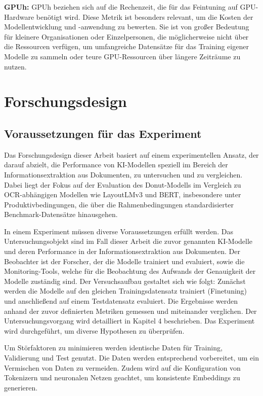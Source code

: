 \textbf{GPUh:} \ac{GPUh} beziehen sich auf die Rechenzeit, die für das Feintuning auf GPU-Hardware benötigt wird. Diese Metrik ist besonders relevant, um die Kosten der Modellentwicklung und -anwendung zu bewerten. Sie ist von großer Bedeutung für kleinere Organisationen oder Einzelpersonen, die möglicherweise nicht über die Ressourcen verfügen, um umfangreiche Datensätze für das Training eigener Modelle zu sammeln oder teure GPU-Ressourcen über längere Zeiträume zu nutzen.

\section{Forschungsdesign}
\subsection{Voraussetzungen für das Experiment}
Das Forschungsdesign dieser Arbeit basiert auf einem experimentellen Ansatz, der darauf abzielt, die Performance von KI-Modellen speziell im Bereich der Informationsextraktion aus Dokumenten, zu untersuchen und zu vergleichen. Dabei liegt der Fokus auf der Evaluation des Donut-Modells im Vergleich zu OCR-abhängigen Modellen wie LayoutLMv3 und BERT, insbesondere unter Produktivbedingungen, die über die Rahmenbedingungen standardisierter Benchmark-Datensätze hinausgehen.

In einem Experiment müssen diverse Voraussetzungen erfüllt werden. Das Untersuchungsobjekt sind im Fall dieser Arbeit die zuvor genannten KI-Modelle und deren Performance in der Informationsextraktion aus Dokumenten. Der Beobachter ist der Forscher, der die Modelle trainiert und evaluiert, sowie die Monitoring-Tools, welche für die Beobachtung des Aufwands der Genauigkeit der Modelle zuständig sind. Der Versuchsaufbau gestaltet sich wie folgt: Zunächst werden die Modelle auf den gleichen Trainingsdatensatz trainiert (Finetuning) und anschließend auf einem Testdatensatz evaluiert. Die Ergebnisse werden anhand der zuvor definierten Metriken gemessen und miteinander verglichen. Der Untersuchungsvorgang wird detailliert in Kapitel 4 beschrieben. Das Experiment wird durchgeführt, um diverse Hypothesen zu überprüfen.

Um Störfaktoren zu minimieren werden identische Daten für Training, Validierung und Test genutzt. Die Daten werden entsprechend vorbereitet, um ein Vermischen von Daten zu vermeiden. Zudem wird auf die Konfiguration von Tokenizern und neuronalen Netzen geachtet, um konsistente Embeddings zu generieren.


